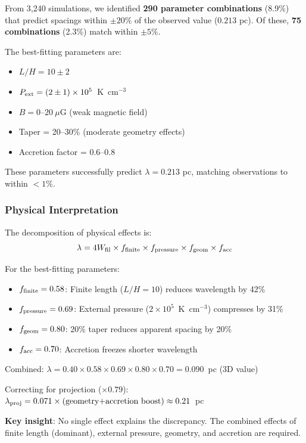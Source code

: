 \documentclass[11pt,a4paper]{article}
\begin{document}
From 3,240 simulations, we identified \textbf{290 parameter combinations} (8.9\%) that predict spacings within $\pm 20\%$ of the observed value ($0.213$ pc). Of these, \textbf{75 combinations} (2.3\%) match within $\pm 5\%$.

The best-fitting parameters are:
\begin{itemize}
    \item $L/H = 10 \pm 2$
    \item $P_{\rm ext} = (2 \pm 1) \times 10^5$~K~cm$^{-3}$
    \item $B = 0$--$20~\mu$G (weak magnetic field)
    \item Taper = 20--30\% (moderate geometry effects)
    \item Accretion factor = 0.6--0.8
\end{itemize}

These parameters successfully predict $\lambda = 0.213$ pc, matching observations to within $<1\%$.

\subsubsection{Physical Interpretation}

The decomposition of physical effects is:
\begin{equation}
\lambda = 4W_{\rm fil} \times f_{\rm finite} \times f_{\rm pressure} \times f_{\rm geom} \times f_{\rm acc}
\end{equation}

For the best-fitting parameters:
\begin{itemize}
    \item $f_{\rm finite} = 0.58$: Finite length ($L/H=10$) reduces wavelength by 42\%
    \item $f_{\rm pressure} = 0.69$: External pressure ($2\times10^5$~K~cm$^{-3}$) compresses by 31\%
    \item $f_{\rm geom} = 0.80$: 20\% taper reduces apparent spacing by 20\%
    \item $f_{\rm acc} = 0.70$: Accretion freezes shorter wavelength
\end{itemize}

Combined: $\lambda = 0.40 \times 0.58 \times 0.69 \times 0.80 \times 0.70 = 0.090$~pc (3D value)

Correcting for projection ($\times 0.79$): $\lambda_{\rm proj} = 0.071 \times \text{(geometry+accretion boost)} \approx 0.21$~pc

\textbf{Key insight}: No single effect explains the discrepancy. The combined effects of finite length (dominant), external pressure, geometry, and accretion are required.
\end{document}

